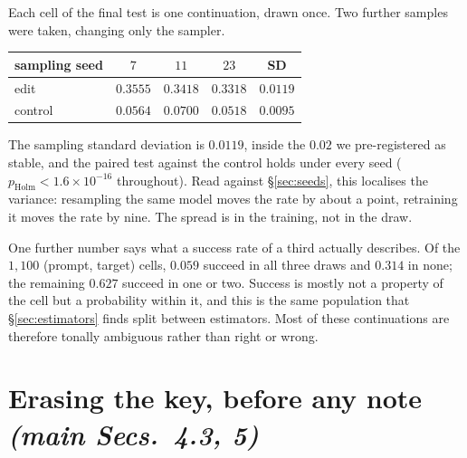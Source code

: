 \documentclass{article}
\begin{document}
Each cell of the final test is one continuation, drawn once. Two further samples were
taken, changing only the sampler.

\begin{center}\footnotesize
\begin{tabular}{@{}lcccc@{}}
\toprule
sampling seed & $7$ & $11$ & $23$ & SD\\
\midrule
edit    & $0.3555$ & $0.3418$ & $0.3318$ & $0.0119$\\
control & $0.0564$ & $0.0700$ & $0.0518$ & $0.0095$\\
\bottomrule
\end{tabular}
\end{center}

The sampling standard deviation is $0.0119$, inside the $0.02$ we pre-registered as
stable, and the paired test against the control holds under every seed
($p_{\text{Holm}} < 1.6 \times 10^{-16}$ throughout). Read against
\S\ref{sec:seeds}, this localises the variance: resampling the same model moves the
rate by about a point, retraining it moves the rate by nine. The spread is in the
training, not in the draw.

One further number says what a success rate of a third actually describes. Of the
$1{,}100$ (prompt, target) cells, $0.059$ succeed in all three draws and $0.314$ in
none; the remaining $0.627$ succeed in one or two. Success is mostly not a property of
the cell but a probability within it, and this is the same population that
\S\ref{sec:estimators} finds split between estimators. Most of these continuations are
therefore tonally ambiguous rather than right or wrong.

\section{Erasing the key, before any note \normalfont\textit{(main Secs.~4.3, 5)}}
\label{sec:erase}
%
\end{document}
